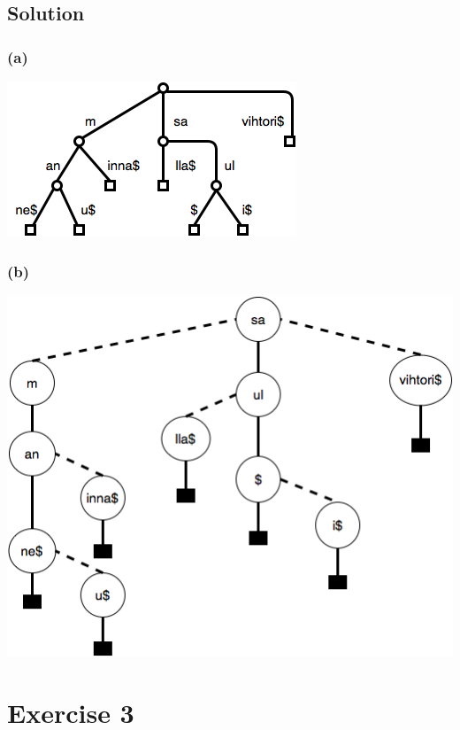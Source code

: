 \documentclass[10pt]{article}
\begin{document}
\subsection*{Solution}
\subsubsection*{(a)}
\begin{center}
\includegraphics[scale=0.65]{CompactTrie}
\end{center}

\subsubsection*{(b)}
\begin{center}
\includegraphics[scale=0.65]{TernaryTrie}
\end{center}

\section*{Exercise 3}
\end{document}
